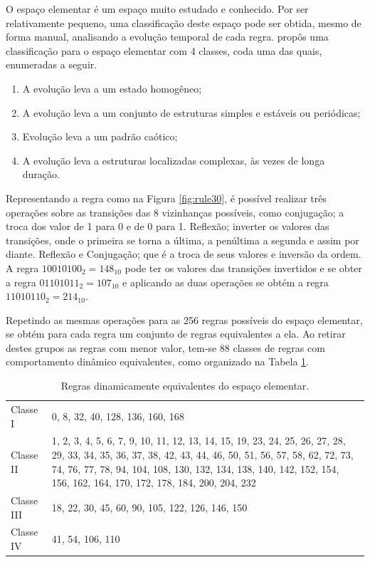 \documentclass[12pt,a4paper]{report}
\begin{document}
	O espaço elementar é um espaço muito estudado e conhecido. Por ser relativamente pequeno, uma classificação deste espaço pode ser obtida, mesmo de forma manual, analisando a evolução temporal de cada regra.  propôs uma classificação para o espaço elementar com 4 classes, coda uma das quais, enumeradas a seguir.
	
	\begin{enumerate}
		\item A evolução leva a um estado homogêneo;
		\item A evolução leva a um conjunto de estruturas simples e estáveis ou periódicas;
		\item Evolução leva a um padrão caótico;
		\item A evolução leva a estruturas localizadas complexas, às vezes de longa duração.
	\end{enumerate}
	
	Representando a regra como na Figura \ref{fig:rule30}, é possível realizar três operações sobre as transições das 8 vizinhanças possíveis, como conjugação; a troca dos valor de 1 para 0 e de 0 para 1. Reflexão; inverter os valores das transições, onde o primeira se torna a última, a penúltima a segunda e assim por diante. Reflexão e Conjugação; que é a troca de seus valores e inversão da ordem. A regra $10010100_2 = 148_{10}$ pode ter os valores das transições invertidos e se obter a regra $01101011_2 = 107_{10}$ e aplicando as duas operações se obtém a regra $11010110_2 = 214_{10}$.
	
	Repetindo as mesmas operações para as 256 regras possíveis do espaço elementar, se obtém para cada regra um conjunto de regras equivalentes a ela. Ao retirar destes grupos as regras com menor valor, tem-se 88 classes de regras com comportamento dinâmico equivalentes, como organizado na Tabela \ref{table:dynamicEquivalentRules}.
	
	\begin{table}[H]
		\caption{Regras dinamicamente equivalentes do espaço elementar.}
		\label{table:dynamicEquivalentRules}
		\begin{tabularx}{\textwidth}{|l|X|}
			\hline
			Classe I & 0, 8, 32, 40, 128, 136, 160, 168 \\
			Classe II & 1, 2, 3, 4, 5, 6, 7, 9, 10, 11, 12, 13, 14, 15, 19, 23, 24, 25, 26, 27, 28, 29, 33, 34, 35, 36, 37, 38, 42, 43, 44, 46, 50, 51, 56, 57, 58, 62, 72, 73, 74, 76, 77, 78, 94, 104, 108, 130, 132, 134, 138, 140, 142, 152, 154, 156, 162, 164, 170, 172, 178, 184, 200, 204, 232 \\
			Classe III & 18, 22, 30, 45, 60, 90, 105, 122, 126, 146, 150 \\
			Classe IV & 41, 54, 106, 110 \\
			\hline
		\end{tabularx}
	\end{table}
	
\end{document}
